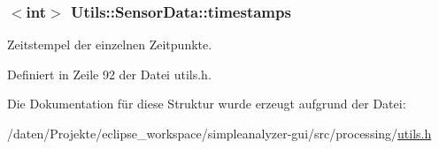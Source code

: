 \hypertarget{structUtils_1_1SensorData_a654f9606c3ddc6e93afb86a116d11ea5}{
\subsubsection[{timestamps}]{$<$int$>$ Utils\-::\-Sensor\-Data\-::timestamps}}\label{structUtils_1_1SensorData_a654f9606c3ddc6e93afb86a116d11ea5}


Zeitstempel der einzelnen Zeitpunkte. 



Definiert in Zeile 92 der Datei utils.\-h.



Die Dokumentation für diese Struktur wurde erzeugt aufgrund der Datei\-:\begin{DoxyCompactItemize}
\item 
/daten/\-Projekte/eclipse\-\_\-workspace/simpleanalyzer-\/gui/src/processing/\hyperlink{utils_8h}{utils.\-h}\end{DoxyCompactItemize}
